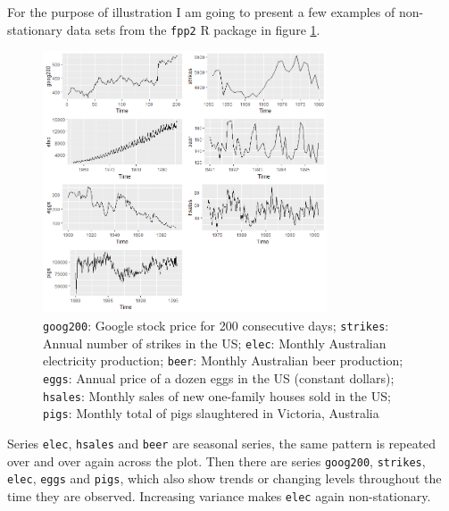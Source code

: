 \documentclass[12pt,a4paper,titlepage]{report}
\begin{document}
For the purpose of illustration I am going to present a few examples of non-stationary data sets from the \texttt{fpp2} R package \cite{fpp2stationarity} in figure \ref{nonstationarityexamples}.

%
\begin{figure}[h]
    \centering
    \includegraphics[width=0.75\textwidth]{dnonstationarityexamples}
    \caption{\texttt{goog200}: Google stock price for 200 consecutive days; \texttt{strikes}: Annual number of strikes in the US; \texttt{elec}: Monthly Australian electricity production; \texttt{beer}: Monthly Australian beer production; \texttt{eggs}: Annual price of a dozen eggs in the US (constant dollars); \texttt{hsales}: Monthly sales of new one-family houses sold in the US; \texttt{pigs}: Monthly total of pigs slaughtered in Victoria, Australia }
    \label{nonstationarityexamples}
\end{figure}

Series \texttt{elec}, \texttt{hsales} and \texttt{beer} are seasonal series, the same pattern is repeated over and over again across the plot. Then there are series \texttt{goog200}, \texttt{strikes}, \texttt{elec}, \texttt{eggs} and \texttt{pigs}, which also show trends or changing levels throughout the time they are observed. Increasing variance makes \texttt{elec} again non-stationary.
\end{document}
